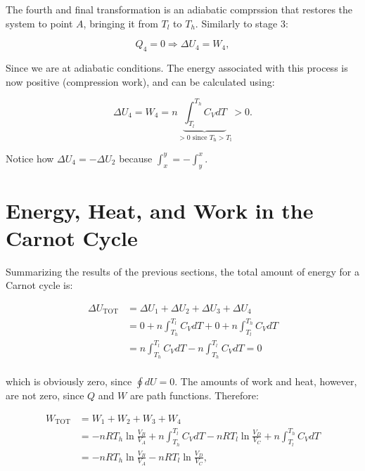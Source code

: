 \documentclass[
  9pt,
]{extbook}
\theoremstyle{definition}
\theoremstyle{definition}
\theoremstyle{definition}
\theoremstyle{remark}
\begin{document}
The fourth and final transformation is an adiabatic comprssion that restores the system to point \(A\), bringing it from \(T_l\) to \(T_h\). Similarly to stage 3:

\begin{equation}
Q_4 = 0 \Rightarrow \Delta U_4 = W_4,
  \label{eq:CCst4}
\end{equation}

Since we are at adiabatic conditions. The energy associated with this process is now positive (compression work), and can be calculated using:

\begin{equation}
\Delta U_4 = W_4 = n \underbrace{\int_{T_l}^{T_h} C_V dT}_{>0 \text{ since } T_\mathrm{h}>T_\mathrm{l}} > 0.
  \label{eq:CCst4b}
\end{equation}

Notice how \(\Delta U_4 = - \Delta U_2\) because \(\int_x^y=-\int_y^x\).

\hypertarget{UWQCarnot}{%
\section{Energy, Heat, and Work in the Carnot Cycle}\label{UWQCarnot}}

Summarizing the results of the previous sections, the total amount of energy for a Carnot cycle is:

\begin{equation}
\begin{aligned}
  \Delta U_{\text{TOT}} & = \Delta U_1+\Delta U_2+\Delta U_3+\Delta U_4 \\
                 & = 0 + n \int_{T_h}^{T_l} C_V dT + 0 + n \int_{T_l}^{T_h} C_V dT  \\
                 & = n \int_{T_h}^{T_l} C_V dT - n \int_{T_h}^{T_l} C_V dT = 0 \\
\end{aligned}
  \label{eq:UtotCC}
\end{equation}

which is obviously zero, since \(\oint dU=0\). The amounts of work and heat, however, are not zero, since \(Q\) and \(W\) are path functions. Therefore:

\begin{equation}
\begin{aligned}
  W_{\text{TOT}} & = W_1+W_2+W_3+W_4 \\
                 & = - nRT_h \ln \frac{V_B}{V_A} + n \int_{T_h}^{T_l} C_V dT - nRT_l \ln \frac{V_D}{V_C} + n \int_{T_l}^{T_h} C_V dT \\
                 & = - nRT_h \ln \frac{V_B}{V_A} - nRT_l \ln \frac{V_D}{V_C}, \\
\end{aligned}
  \label{eq:WtotCC}
\end{equation}
\end{document}
